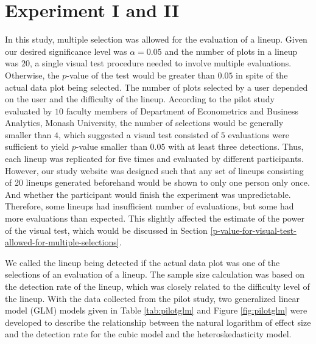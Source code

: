 \documentclass{monashthesis}
\theoremstyle{definition}
\theoremstyle{definition}
\theoremstyle{definition}
\theoremstyle{definition}
\theoremstyle{remark}
\begin{document}
\hypertarget{experiment-i-and-ii}{%
\section{Experiment I and II}\label{experiment-i-and-ii}}

In this study, multiple selection was allowed for the evaluation of a lineup. Given our desired significance level was \(\alpha = 0.05\) and the number of plots in a lineup was \(20\), a single visual test procedure needed to involve multiple evaluations. Otherwise, the \(p\)-value of the test would be greater than \(0.05\) in spite of the actual data plot being selected. The number of plots selected by a user depended on the user and the difficulty of the lineup. According to the pilot study evaluated by \(10\) faculty members of Department of Econometrics and Business Analytics, Monash University, the number of selections would be generally smaller than \(4\), which suggested a visual test consisted of \(5\) evaluations were sufficient to yield \(p\)-value smaller than \(0.05\) with at least three detections. Thus, each lineup was replicated for five times and evaluated by different participants. However, our study website was designed such that any set of lineups consisting of 20 lineups generated beforehand would be shown to only one person only once. And whether the participant would finish the experiment was unpredictable. Therefore, some lineups had insufficient number of evaluations, but some had more evaluations than expected. This slightly affected the estimate of the power of the visual test, which would be discussed in Section \ref{p-value-for-visual-test-allowed-for-multiple-selections}.

We called the lineup being detected if the actual data plot was one of the selections of an evaluation of a lineup. The sample size calculation was based on the detection rate of the lineup, which was closely related to the difficulty level of the lineup. With the data collected from the pilot study, two generalized linear model (GLM) models given in Table \ref{tab:pilotglm} and Figure \ref{fig:pilotglm} were developed to describe the relationship between the natural logarithm of effect size and the detection rate for the cubic model and the heteroskedasticity model.
\end{document}
